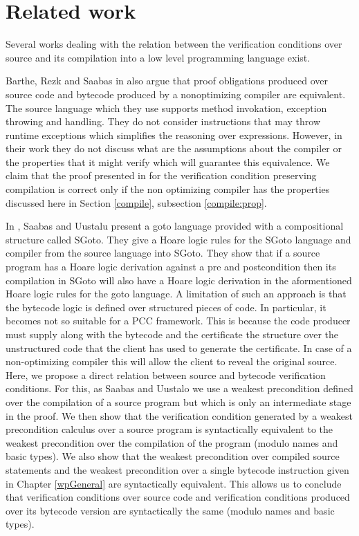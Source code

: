 \section{Related work}\label{pog:relWork}


Several works dealing with the relation between the 
verification conditions over source and its compilation into a low  level  programming  language exist.

Barthe, Rezk and Saabas in \cite{gta05:fast} also argue that proof obligations produced
over source code and
bytecode produced by a nonoptimizing compiler   are equivalent.
The source language which they use supports method invokation, exception throwing and handling. 
They do not consider instructions that may throw runtime exceptions which simplifies the reasoning over expressions. 
 However, in their work they do not discuss  what are the  assumptions about the compiler 
or the  properties that it might verify  which will guarantee this equivalence.
 We claim that the proof presented in \cite{gta05:fast} for
 the verification condition preserving compilation is correct only if the non optimizing 
 compiler has the properties discussed here in Section \ref{compile}, subsection \ref{compile:prop}.


In \cite{SU05CNS}, Saabas and Uustalu present a goto language provided with a compositional structure called SGoto.
They give a Hoare logic rules for the SGoto language and compiler from the source language into SGoto.
They show that if a source program has a Hoare logic derivation
 against a pre and postcondition then its compilation in SGoto will also have a Hoare
 logic derivation in the aformentioned Hoare logic rules for the goto language. 
A limitation of such an approach is that the bytecode logic is defined over structured pieces of code. In particular,
it becomes not so suitable for  a  PCC framework. This is because the code producer must supply along with the 
bytecode and the certificate the structure over the unstructured code that the client has used to
 generate the certificate. In case of a non-optimizing compiler this will allow the client to reveal the original source. 
Here, we propose a direct relation between source and bytecode verification conditions. 
 For this, as Saabas and Uustalo we use a  weakest precondition defined over the compilation of a source program 
but which is only an intermediate stage in the proof. 
We then show that the verification condition generated by
a weakest precondition calculus over a source program is syntactically equivalent to the 
weakest precondition over the compilation of the program (modulo names and basic types). We also show that the weakest precondition over compiled source statements
and the weakest precondition over a single bytecode instruction given in Chapter \ref{wpGeneral} are syntactically equivalent.
This allows us to conclude that verification conditions over source code and verification conditions produced over its bytecode version
are syntactically the same (modulo names and basic types).

